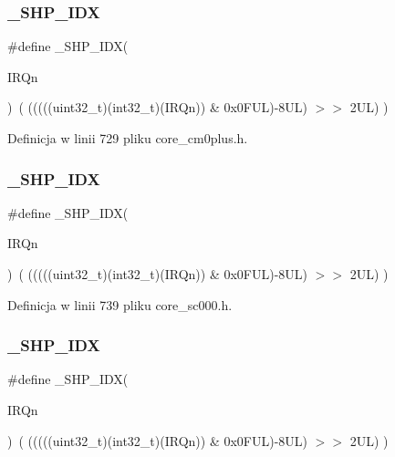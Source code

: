 \subsubsection{\texorpdfstring{\+\_\+\+S\+H\+P\+\_\+\+I\+DX}{\_SHP\_IDX}\hspace{0.1cm}{\footnotesize\ttfamily [3/6]}}
{\footnotesize\ttfamily \#define \+\_\+\+S\+H\+P\+\_\+\+I\+DX(\begin{DoxyParamCaption}\item[{}]{I\+R\+Qn }\end{DoxyParamCaption})~( (((((uint32\+\_\+t)(int32\+\_\+t)(I\+R\+Qn)) \& 0x0\+F\+U\+L)-\/8\+U\+L) $>$$>$    2\+U\+L)      )}



Definicja w linii 729 pliku core\+\_\+cm0plus.\+h.

\mbox{\label{group___c_m_s_i_s___core___n_v_i_c_functions_gaee4f7eb5d7e770ad51489dbceabb1755}} 
\subsubsection{\texorpdfstring{\+\_\+\+S\+H\+P\+\_\+\+I\+DX}{\_SHP\_IDX}\hspace{0.1cm}{\footnotesize\ttfamily [4/6]}}
{\footnotesize\ttfamily \#define \+\_\+\+S\+H\+P\+\_\+\+I\+DX(\begin{DoxyParamCaption}\item[{}]{I\+R\+Qn }\end{DoxyParamCaption})~( (((((uint32\+\_\+t)(int32\+\_\+t)(I\+R\+Qn)) \& 0x0\+F\+U\+L)-\/8\+U\+L) $>$$>$    2\+U\+L)      )}



Definicja w linii 739 pliku core\+\_\+sc000.\+h.

\mbox{\label{group___c_m_s_i_s___core___n_v_i_c_functions_gaee4f7eb5d7e770ad51489dbceabb1755}} 
\subsubsection{\texorpdfstring{\+\_\+\+S\+H\+P\+\_\+\+I\+DX}{\_SHP\_IDX}\hspace{0.1cm}{\footnotesize\ttfamily [5/6]}}
{\footnotesize\ttfamily \#define \+\_\+\+S\+H\+P\+\_\+\+I\+DX(\begin{DoxyParamCaption}\item[{}]{I\+R\+Qn }\end{DoxyParamCaption})~( (((((uint32\+\_\+t)(int32\+\_\+t)(I\+R\+Qn)) \& 0x0\+F\+U\+L)-\/8\+U\+L) $>$$>$    2\+U\+L)      )}



